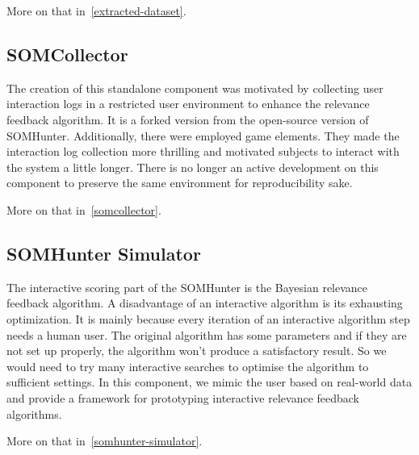 More on that in~\cref{extracted-dataset}.

\subsection{SOMCollector}

The creation of this standalone component was motivated by collecting user interaction logs in a restricted user environment to enhance the relevance feedback algorithm. It is a forked version from the open-source version of SOMHunter. Additionally, there were employed game elements. They made the interaction log collection more thrilling and motivated subjects to interact with the system a little longer. There is no longer an active development on this component to preserve the same environment for reproducibility sake.

More on that in~\cref{somcollector}.

\subsection{SOMHunter Simulator}

The interactive scoring part of the SOMHunter is the Bayesian relevance feedback algorithm. A disadvantage of an interactive algorithm is its exhausting optimization. It is mainly because every iteration of an interactive algorithm step needs a human user. The original algorithm has some parameters and if they are not set up properly, the algorithm won't produce a satisfactory result. So we would need to try many interactive searches to optimise the algorithm to sufficient settings. In this component, we mimic the user based on real-world data and provide a framework for prototyping interactive relevance feedback algorithms.

More on that in~\cref{somhunter-simulator}.


